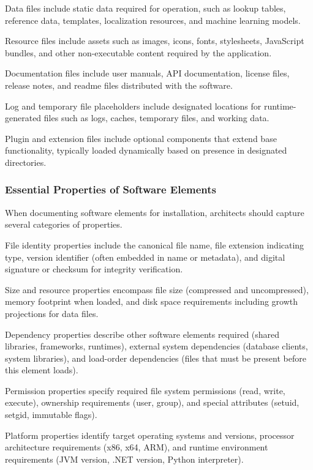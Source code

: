 \documentclass[11pt]{article}
\begin{document}
Data files include static data required for operation, such as lookup tables, reference data, templates, localization resources, and machine learning models.

Resource files include assets such as images, icons, fonts, stylesheets, JavaScript bundles, and other non-executable content required by the application.

Documentation files include user manuals, API documentation, license files, release notes, and readme files distributed with the software.

Log and temporary file placeholders include designated locations for runtime-generated files such as logs, caches, temporary files, and working data.

Plugin and extension files include optional components that extend base functionality, typically loaded dynamically based on presence in designated directories.

\subsubsection{Essential Properties of Software Elements}

When documenting software elements for installation, architects should capture several categories of properties.

File identity properties include the canonical file name, file extension indicating type, version identifier (often embedded in name or metadata), and digital signature or checksum for integrity verification.

Size and resource properties encompass file size (compressed and uncompressed), memory footprint when loaded, and disk space requirements including growth projections for data files.

Dependency properties describe other software elements required (shared libraries, frameworks, runtimes), external system dependencies (database clients, system libraries), and load-order dependencies (files that must be present before this element loads).

Permission properties specify required file system permissions (read, write, execute), ownership requirements (user, group), and special attributes (setuid, setgid, immutable flags).

Platform properties identify target operating systems and versions, processor architecture requirements (x86, x64, ARM), and runtime environment requirements (JVM version, .NET version, Python interpreter).
\end{document}

